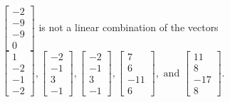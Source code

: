 \begin{exercise}
\begin{exerciseStatement}
  \end{exerciseStatement}
  \begin{exerciseAnswer}
   \(\left[\begin{array}{c}
-2 \\
-9 \\
-9 \\
0
\end{array}\right]\) 
  	 is not  
	a linear combination of the vectors \(\left[\begin{array}{c}
1 \\
-2 \\
-1 \\
-2
\end{array}\right] , \left[\begin{array}{c}
-2 \\
-1 \\
3 \\
-1
\end{array}\right] , \left[\begin{array}{c}
-2 \\
-1 \\
3 \\
-1
\end{array}\right] , \left[\begin{array}{c}
7 \\
6 \\
-11 \\
6
\end{array}\right] , \text{ and } \left[\begin{array}{c}
11 \\
8 \\
-17 \\
8
\end{array}\right]\).

	
  


  \end{exerciseAnswer}
\end{exercise}